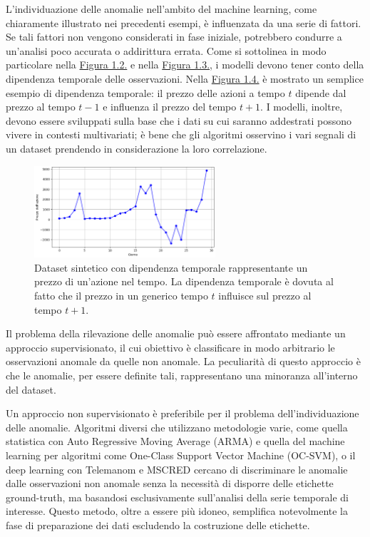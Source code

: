     L'individuazione delle anomalie nell'ambito del machine learning, come chiaramente 
    illustrato nei precedenti esempi, è influenzata da una serie di fattori.
    Se tali fattori non vengono considerati in fase iniziale, potrebbero condurre a un'analisi poco accurata o addirittura errata. 
    Come si sottolinea in modo particolare nella \hyperref[fig:contextual-anomaly]{Figura 1.2.} e nella 
    \hyperref[fig:collective-anomaly]{Figura 1.3.}, i modelli devono tener conto della dipendenza temporale 
    delle osservazioni. Nella \hyperref[fig:temporal-dependency]{Figura 1.4.} è mostrato un semplice esempio
    di dipendenza temporale: il prezzo delle azioni a tempo $t$ dipende dal prezzo al tempo $t-1$ e influenza 
    il prezzo del tempo $t+1$. I modelli, inoltre, devono essere sviluppati sulla base che i dati su cui saranno addestrati 
    possono vivere in contesti multivariati; è bene che gli algoritmi osservino i vari segnali di un dataset 
    prendendo in considerazione la loro correlazione.

\begin{figure}[H]
    \centering
    \includegraphics[width=0.6\textwidth]{./input/chapters/figs/temporal-dependency.png}
    \caption{Dataset sintetico con dipendenza temporale rappresentante un prezzo di un'azione nel tempo. La dipendenza temporale è dovuta
    al fatto che il prezzo in un generico tempo $t$ influisce sul prezzo al tempo $t+1$.}
    \label{fig:temporal-dependency}
\end{figure}    

    Il problema della rilevazione delle anomalie può essere affrontato mediante un approccio supervisionato, 
    il cui obiettivo è classificare in modo arbitrario le osservazioni anomale da quelle non anomale. 
    La peculiarità di questo approccio è che le anomalie, per essere definite tali, rappresentano una minoranza 
    all'interno del dataset.

    Un approccio non supervisionato è preferibile per il problema dell'individuazione delle anomalie. Algoritmi 
    diversi che utilizzano metodologie varie, come quella statistica con Auto Regressive Moving Average\cite{arma} (ARMA) e quella del machine learning per algoritmi come 
    One-Class Support Vector Machine\cite{ocsvm} (OC-SVM), o il deep learning con Telemanom\cite{telemanom} e MSCRED\cite{mscred}
    cercano di discriminare le anomalie dalle osservazioni non anomale senza la necessità di disporre
    delle etichette ground-truth, ma basandosi esclusivamente sull'analisi della serie 
    temporale di interesse. Questo metodo, oltre a essere più idoneo, semplifica notevolmente 
    la fase di preparazione dei dati escludendo la costruzione delle etichette.

